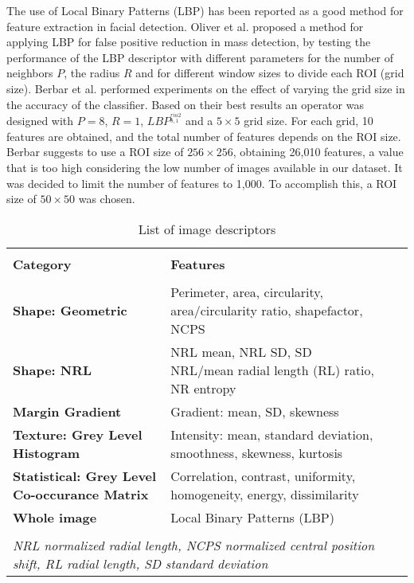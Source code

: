 The use of Local Binary Patterns (LBP) has been reported as a good method for feature extraction in facial detection. Oliver et al. \cite{Oliver2007} proposed a method for applying LBP for false positive reduction in mass detection, by testing the performance of the LBP descriptor with different parameters for the number of neighbors $P$, the radius $R$ and for different window sizes to divide each ROI (grid size). Berbar et al. \cite{Berbar2012} performed experiments on the effect of varying the grid size in the accuracy of the classifier. Based on their best results an operator was designed with $P=8$, $R=1$, $LBP^{_{8,1}^{riu2}}$ and a $5\times5$ grid size. For each grid, 10 features are obtained, and the total number of features depends on the ROI size. Berbar suggests to use a ROI size of $256\times256$, obtaining 26,010 features, a value that is too high considering the low number of images available in our dataset. It was decided to limit the number of features to 1,000. To accomplish this, a ROI size of $50\times50$ was chosen.  

\begin{table*}[ht]
\centering
\caption{List of image descriptors}
\label{tab:features}
\begin{tabular}{llll}
\\ [-1.75ex] \cline{1-2} \\ [-1.75ex]
\textbf{Category}                                          & \textbf{Features}                                                             &  &  \\ [0.75ex] \cline{1-2} \\ [-1.5ex]
\textbf{Shape: Geometric}                                  & Perimeter, area, circularity, area/circularity ratio, shapefactor, NCPS       &  &  \\
\textbf{Shape: NRL}                                        & NRL mean, NRL SD, SD NRL/mean radial length (RL) ratio, NR entropy            &  &  \\
\textbf{Margin Gradient}                                   & Gradient: mean, SD, skewness                                                  &  &  \\
\textbf{Texture: Grey Level Histogram}                     & Intensity: mean, standard deviation, smoothness, skewness, kurtosis           &  &  \\
\textbf{Statistical: Grey Level Co-occurance Matrix}       & Correlation, contrast, uniformity, homogeneity, energy, dissimilarity         &  &  \\
\textbf{Whole image}                                      & Local Binary Patterns (LBP)                                                   &  &  \\ [0.75ex] \cline{1-2} \\ [-1.75ex]
\multicolumn{2}{l}{\textit{NRL normalized radial length, NCPS normalized central position shift, RL radial length, SD standard deviation}} &  & 
\end{tabular}
\end{table*}

